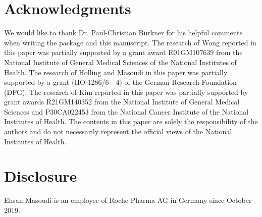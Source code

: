 \section*{Acknowledgments}
We would like to thank Dr. Paul-Christian B\"urkner for his  helpful comments when writing the package and this manuscript.
The research of Wong reported in this paper was partially supported by a grant award R01GM107639 from the National Institute of General Medical Sciences of the National Institutes of Health.
The research of Holling and Masoudi  in this paper was partially supported by a grant (HO 1286/6 - 4) of the German Research Foundation (DFG).
The research of Kim reported in this paper was partially supported by grant awards R21GM140352 from the National Institute of General Medical Sciences and P30CA022453 from the National Cancer Institute of the National Institutes of Health.
The contents in this paper are solely the responsibility of the authors and do not necessarily represent the official views of the National Institutes of Health.

\section*{Disclosure}
Ehsan Masoudi is an employee of Roche Pharma AG in Germany since October 2019.

%


\address{Ehsan Masoudi\\
      Department of Psychology, University of M{\"u}nster\\
      Fliednerstr. 21, 48149 Germany\\
      }

\address{Heinz Holling\\
    Department of Psychology, University of M{\"u}nster\\
    Fliednerstr. 21, 48149 Germany \\
  }
  
\address{Weng Kee Wong\\
    Department of Biostatistics \\
    UCLA Fielding School of Public Health\\
    Los Angeles, CA 90095-1772, USA \\
    }
    
\address{Seongho Kim\\
    Biostatistics and Bioinformatics Core, Karmanos Cancer Institute\\
    Department of Oncology, Wayne State University School of Medicine\\
    Detroit, MI 48201, USA \\
    }

